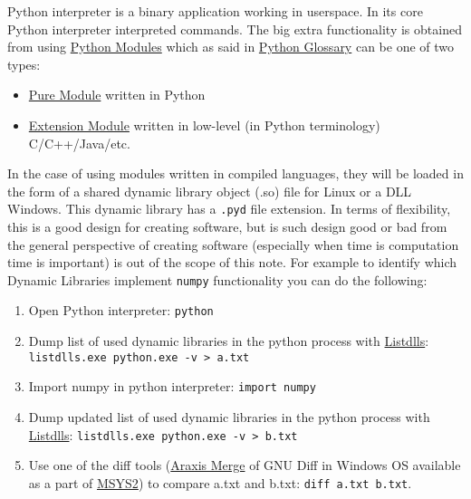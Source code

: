 \documentclass[
]{article}
\begin{document}
Python interpreter is a binary application working in userspace. In its
core Python interpreter interpreted commands. The big extra
functionality is obtained from using
\href{https://packaging.python.org/en/latest/glossary/\#term-Module}{Python
Modules} which as said in
\href{https://packaging.python.org/en/latest/glossary/}{Python Glossary}
can be one of two types:

\begin{itemize}
\item
  \href{https://packaging.python.org/en/latest/glossary/\#term-Pure-Module}{Pure
  Module} written in Python
\item
  \href{https://packaging.python.org/en/latest/glossary/\#term-Extension-Module}{Extension
  Module} written in low-level (in Python terminology) C/C++/Java/etc.
\end{itemize}

In the case of using modules written in compiled languages, they will be
loaded in the form of a shared dynamic library object (.so) file for
Linux or a DLL Windows. This dynamic library has a \texttt{.pyd} file
extension. In terms of flexibility, this is a good design for creating
software, but is such design good or bad from the general perspective of
creating software (especially when time is computation time is
important) is out of the scope of this note. For example to identify
which Dynamic Libraries implement \texttt{numpy} functionality you can
do the following:

\begin{enumerate}
\def\labelenumi{\arabic{enumi}.}
\item
  Open Python interpreter: \texttt{python}
\item
  Dump list of used dynamic libraries in the python process with
  \href{https://learn.microsoft.com/en-us/sysinternals/downloads/listdlls}{Listdlls}:
  \texttt{listdlls.exe\ python.exe\ -v\ \textgreater{}\ a.txt}
\item
  Import numpy in python interpreter: \texttt{import\ numpy}
\item
  Dump updated list of used dynamic libraries in the python process with
  \href{https://learn.microsoft.com/en-us/sysinternals/downloads/listdlls}{Listdlls}:
  \texttt{listdlls.exe\ python.exe\ -v\ \textgreater{}\ b.txt}
\item
  Use one of the diff tools
  (\href{https://www.araxis.com/merge/index.en}{Araxis Merge} of GNU
  Diff in Windows OS available as a part of
  \href{https://www.msys2.org/}{MSYS2}) to compare a.txt and b.txt:
  \texttt{diff\ a.txt\ b.txt}.
\end{enumerate}
\end{document}
